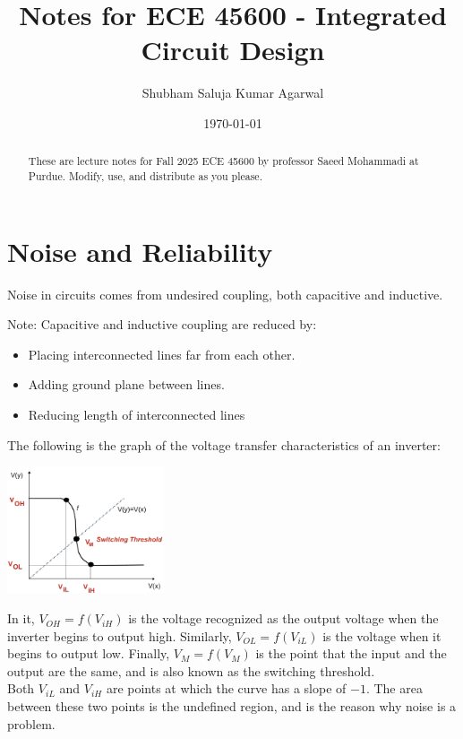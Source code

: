 \documentclass[nobib]{tufte-handout}
\title{Notes for ECE 45600 - Integrated Circuit Design}
\author[Shubham Saluja Kumar Agarwal]{Shubham Saluja Kumar Agarwal}
\date{\today}  %
\begin{document}
\maketitle

\begin{abstract}
    These are lecture notes for Fall 2025 ECE 45600 by professor Saeed Mohammadi at Purdue. Modify, use, and distribute as you please.
\end{abstract}

\tableofcontents

\newpage

\section{Noise and Reliability}
Noise in circuits comes from undesired coupling, both capacitive and
inductive.\\
\begin{mdframed}
    Note: Capacitive and inductive coupling are reduced by:
    \begin{itemize}
        \item Placing interconnected lines far from each other.
        \item Adding ground plane between lines.
        \item Reducing length of interconnected lines
    \end{itemize}
\end{mdframed}
The following is the graph of the voltage transfer characteristics of an inverter:
\begin{center}
    \includegraphics[width = 175px]{images/voltage_transfer_characteristics.png}
\end{center}
In it, $V_{OH} = f(V_{iH})$ is the voltage recognized as the output voltage when the inverter begins to output high. Similarly, $V_{OL} = f(V_{iL})$ is the voltage when it begins to output low. Finally, $V_M = f(V_M)$ is the point that the input and the output are the same, and is also known as the switching threshold.\\
Both $V_{iL}$ and $V_{iH}$ are points at which the curve has a slope of $-1$. The area between these two points is the undefined region, and is the reason why noise is a problem.\\
\end{document}
